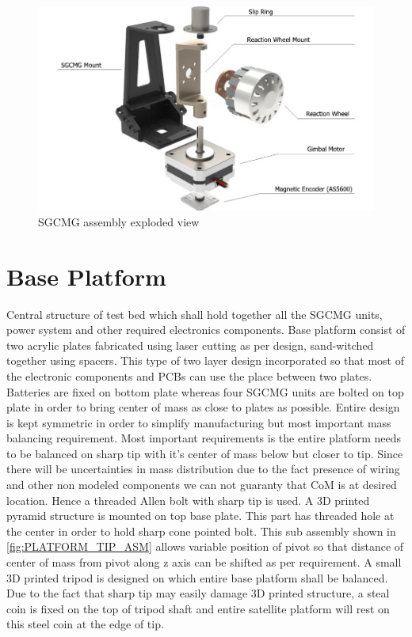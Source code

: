 \begin{figure}[ht]
    \centering
    \includegraphics[width=\textwidth]{figures/Assembly/sgcmg_asm.pdf}
    \caption{SGCMG assembly exploded view }
    \label{fig:SGCMG_ASM_exp}
\end{figure}

\section{Base Platform}
Central structure of test bed which shall hold together all the SGCMG units, power system and other required electronics components. Base platform consist of two acrylic plates fabricated using laser cutting as per design, sand-witched together using spacers. This type of two layer design incorporated so that most of the electronic components and PCBs can use the place between two plates. Batteries are fixed on bottom plate whereas four SGCMG units are bolted on top plate in order to bring center of mass as close to plates as possible. Entire design is kept symmetric in order to simplify manufacturing but most important mass balancing requirement. Most important requirements is the entire platform needs to be balanced on sharp tip with it's center of mass below but closer to tip. Since there will be uncertainties in mass distribution due to the fact presence of wiring and other non modeled components we can not guaranty that CoM is at desired location. Hence a threaded Allen bolt with sharp tip is used. A 3D printed pyramid structure is mounted on top base plate. This part has threaded hole at the center in order to hold sharp cone pointed bolt. This sub assembly shown in \autoref{fig:PLATFORM_TIP_ASM} allows variable position of pivot so that distance of center of mass from pivot along z axis can be shifted as per requirement. A small 3D printed tripod is designed on which entire base platform shall be balanced. Due to the fact that sharp tip may easily damage 3D printed structure, a steal coin is fixed on the top of tripod shaft and entire satellite platform will rest on this steel coin at the edge of tip.


